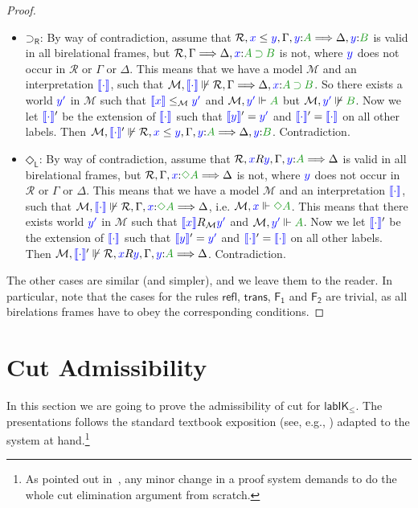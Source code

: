 \documentclass[a4paper]{article}
\theoremstyle{plain}
\theoremstyle{definition}
\newcommand*{\IK}{\mathsf{IK}}
\newcommand*{\labIKp}{\lab\IK_{\le}}
\newcommand*{\IMP}{\mathbin{\supset}}%
\newcommand*{\DIA}{\mathord{\Diamond}}
\newcommand{\B}{\mathcal{R}}
\newcommand{\Left}{\Gamma} %
\newcommand{\Right}{\Delta} %
\newcommand*{\fm}[1]{{\color{notgreen}{#1}}}
\newcommand*{\lb}[1]{{\color{blue}{#1}}}
\newcommand*{\rel}{R}
\newcommand*{\labels}[2]{\lb{#1}\mathord{:}\fm{#2}}
\newcommand*{\accs}[2]{\lb{#1}R\lb{#2}}
\newcommand*{\futs}[2]{\lb{#1}\le{\lb{#2}}}
\newcommand{\SEQ}{\Longrightarrow}
\newcommand*{\rn}[1]  {\ensuremath{\mathsf{#1}}}
\newcommand*{\lab}{\mathsf{lab}}
\newcommand*{\rlabrn}[2][]  {\rn{#2}_\rn{R#1}}%
\newcommand*{\llabrn}[2][]  {\rn{#2}_\rn{L#1}}%
\newcommand{\M}{\mathcal{M}}
\newcommand{\inter}[1]{\lb{\llbracket #1\rrbracket}}
\newcommand{\nforce}[3]{#1,#2\not\Vdash#3}
\newcommand{\cforce}[3]{#1,\lb{#2}\Vdash\fm{#3}}
\begin{document}
\begin{proof}
\begin{itemize}
		\item $\rlabrn\IMP$: By way of contradiction, assume that $\B, \futs xy, \Left, \labels{y}{A} \SEQ \Right, \labels{y}{B}$ is valid in all birelational frames, but $\B, \Left \SEQ \Right, \labels{x}{A \IMP B}$ is not, where $\lb y$ does not occur in $\B$ or $\Left$ or $\Right$. This means that we have a model $\M$ and an interpretation $\inter\cdot$, such that $\nforce\M{\inter\cdot}{\B, \Left \SEQ \Right, \labels{x}{A \IMP B}}$. So there exists a world $\lb{y'}$ in $\M$ such that $\inter x\le_\M \lb{y'}$ and $\cforce\M{y'}{A}$ but $\nforce\M{\lb{y'}}{\fm B}$. Now we let 	$\inter\cdot'$ be the extension of $\inter\cdot$ such that $\inter y'=\lb{y'}$ and $\inter\cdot'=\inter\cdot$ on all other labels. Then $\nforce\M{\inter\cdot'}{\B, \futs xy, \Left, \labels{y}{A} \SEQ \Right, \labels{y}{B}}$. Contradiction.
		
		\item $\llabrn\DIA$: By way of contradiction, assume that $\B, \accs xy, \Left, \labels{y}{A} \SEQ \Right$ is valid in all birelational frames, but $\B, \Left, \labels{x}{\DIA A} \SEQ \Right$ is not, where $\lb y$ does not occur in $\B$ or $\Left$ or $\Right$. This means that we have a model $\M$ and an interpretation $\inter\cdot$, such that $\nforce\M{\inter\cdot}{\B, \Left, \labels{x}{\DIA A} \SEQ \Right}$, i.e. $\cforce \M x{\DIA A}$. This means that there exists world $\lb{y'}$ in $\M$ such that $\inter x\rel_\M \lb{y'}$ and $\cforce \M {\lb{y'}}{A}$. Now we let $\inter\cdot'$ be the extension of $\inter\cdot$ such that $\inter y'=\lb{y'}$ and $\inter\cdot' = \inter\cdot$ on all other labels. Then $\nforce\M{\inter\cdot'}{\B, \accs xy, \Left, \labels{y}{A} \SEQ \Right}$. Contradiction.
		
	\end{itemize}
	The other cases are similar (and simpler), and we leave them to the
	reader. In particular, note that the cases for the rules $\rn{refl}$,
	$\rn{trans}$, $\rn{F_1}$ and $\rn{F_2}$ are trivial, as all
	birelations frames have to obey the corresponding conditions.
\end{proof}

\section{Cut Admissibility}\label{sec:cut-elim}
In this section we are going to prove the admissibility of cut for
$\labIKp$. The presentations follows the standard textbook
exposition (see, e.g., \cite{troelstra:schwichtenberg:00,negri:vonplato:01})
adapted to the system at hand.\footnote{As pointed out
	in~\cite{girard:87:a}, any minor change in a proof system demands
	to do the whole cut elimination argument from scratch.}
\end{document}
